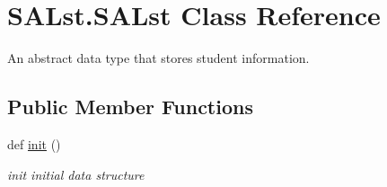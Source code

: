 \hypertarget{class_s_a_lst_1_1_s_a_lst}{}\section{S\+A\+Lst.\+S\+A\+Lst Class Reference}
\label{class_s_a_lst_1_1_s_a_lst}


An abstract data type that stores student information.  


\subsection*{Public Member Functions}
\begin{DoxyCompactItemize}
\item 
\mbox{\label{class_s_a_lst_1_1_s_a_lst_ac0886d79feebf875207b927b6d23a959}} 
def \mbox{\hyperlink{class_s_a_lst_1_1_s_a_lst_ac0886d79feebf875207b927b6d23a959}{init}} ()
\begin{DoxyCompactList}\small\item\em init initial data structure \end{DoxyCompactList}\end{DoxyCompactItemize}
